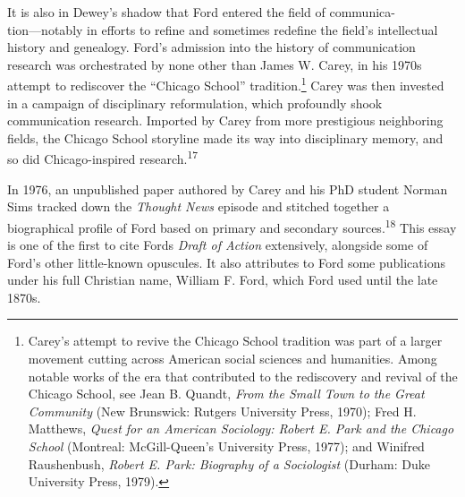 \documentclass[twoside,symmetric,nobib,justified]{tufte-book}
\begin{document}
It is also in Dewey's shadow that Ford entered the field of
communica-\\\noindent tion---notably in efforts to refine and sometimes redefine the
field's intellectual history and genealogy. Ford's admission into the
history of communication research was orchestrated by none other than
James W. Carey, in his 1970s attempt to rediscover the ``Chicago
School'' tradition.\footnote{Carey's attempt to revive the Chicago
  School tradition was part of a larger movement cutting across American
  social sciences and humanities. Among notable works of the era that
  contributed to the rediscovery and revival of the Chicago School, see
  Jean B. Quandt, \emph{From the Small Town to the Great Community} (New
  Brunswick: Rutgers University Press, 1970); Fred H. Matthews,
  \emph{Quest for an American Sociology: Robert E. Park and the Chicago
  School} (Montreal: McGill-Queen's University Press, 1977); and
  Winifred Raushenbush, \emph{Robert E. Park: Biography of a
  Sociologist} (Durham: Duke University Press, 1979).} Carey was then
invested in a campaign of disciplinary reformulation, which profoundly
shook communication research. Imported by Carey from more prestigious
neighboring fields, the Chicago School storyline made its way into
disciplinary memory, and so did Chicago-inspired research.\textsuperscript{17}

In 1976, an unpublished paper authored by Carey and his PhD student
Norman Sims tracked down the \emph{Thought News} episode and stitched
together a biographical profile of Ford based on primary and secondary
sources.\textsuperscript{18} This essay is
one of the first to cite Ford\textquotesingle s \emph{Draft of Action}
extensively, alongside some of Ford's other little-known opuscules. It
also attributes to Ford some publications under his full Christian name,
William F. Ford, which Ford used until the late 1870s.
\end{document}
